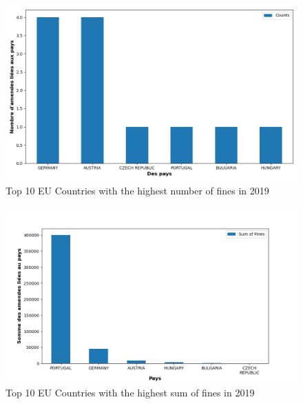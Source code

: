 \documentclass[12pt]{article}
\begin{document}
	\begin{figure}
		[H]\centering\includegraphics[scale=.5]{graphs/top10_countries_year}
		\caption{Top 10 EU Countries with the highest number of fines in 2019}
	\end{figure}
	\begin{figure}
		[H]\centering\includegraphics[scale=.5]{graphs/top10_countries_year_fines}
		\caption{Top 10 EU Countries with the highest sum of fines in 2019}
	\end{figure}
\end{document}
